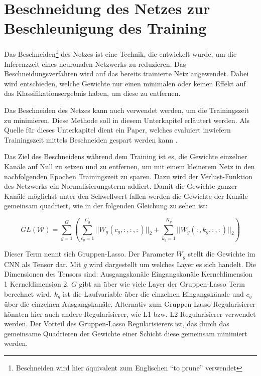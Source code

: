 \section{Beschneidung des Netzes zur Beschleunigung des Training}
\label{sec:prunetrain}
Das Beschneiden\footnote{Beschneiden wird hier äquivalent zum Englischen  "`to prune"' verwendet} des Netzes ist eine Technik, die entwickelt wurde, um die Inferenzzeit eines neuronalen Netzwerks zu reduzieren. Das Beschneidungsverfahren wird auf das bereits trainierte Netz angewendet. Dabei wird entschieden, welche Gewichte nur einen minimalen oder keinen Effekt auf das Klassifikationsergebnis haben, um diese zu entfernen.

Das Beschneiden des Netzes kann auch verwendet werden, um die Trainingszeit zu minimieren. Diese Methode soll in diesem Unterkapitel erläutert werden. Als Quelle für dieses Unterkapitel dient ein Paper, welches evaluiert inwiefern Trainingszeit mittels Beschneiden gespart werden kann \cite{prunetrain}.


Das Ziel des Beschneidens während dem Training ist es, die Gewichte einzelner Kanäle auf Null zu setzen und zu entfernen, um mit einem kleinerem Netz in den nachfolgenden Epochen Trainingszeit zu sparen. Dazu wird der Verlust-Funktion des Netzwerks ein Normalisierungsterm addiert. Damit die Gewichte ganzer Kanäle möglichst unter den Schwellwert fallen werden die Gewichte der Kanäle gemeinsam quadriert, wie in der folgenden Gleichung zu sehen ist:

\begin{equation}
GL(\mathcal{W})=\sum_{g=1}^{G} \left( \sum_{c_g=1}^{C_g} || W_{g} (c_g,:,:,:) ||_2 + \sum_{k_g=1}^{K_g} || W_{g}(:,k_g,:,:)||_2 \right)
 \label{equ:PTloss}
\end{equation}

Dieser Term nennt sich Gruppen-Lasso. Der Parameter $W_{g}$ stellt die Gewichte im CNN als Tensor dar. Mit $g$ wird dargestellt um welches Layer es sich handelt. Die Dimensionen des Tensors sind: Ausgangskanäle \texttimes Eingangskanäle \texttimes Kerneldimension 1 \texttimes Kerneldimension 2. $G$ gibt an über wie viele Layer der Gruppen-Lasso Term berechnet wird. $k_g$ ist die Laufvariable über die einzelnen Eingangskänale und $c_g$ über die einzelnen Ausgangskanäle. Alternativ zum Gruppen-Lasso Regularisierer könnten hier auch andere Regularisierer, wie L1 bzw. L2 Regularisierer verwendet werden. Der Vorteil des Gruppen-Lasso Regularisierers ist, das durch das gemeinsame Quadrieren der Gewichte einer Schicht diese gemeinsam minimiert werden.


